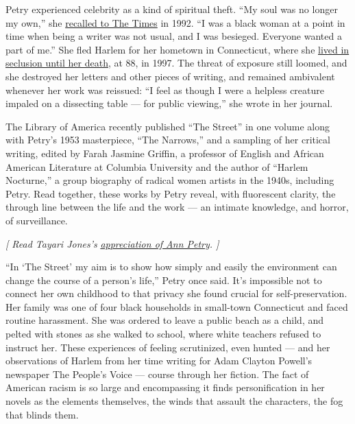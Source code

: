 Petry experienced celebrity as a kind of spiritual theft. ``My soul was
no longer my own,'' she
\href{https://www.nytimes3xbfgragh.onion/1992/01/08/books/an-author-s-look-at-1940-s-harlem-is-being-reissued.html}{recalled
to The Times} in 1992. ``I was a black woman at a point in time when
being a writer was not usual, and I was besieged. Everyone wanted a part
of me.'' She fled Harlem for her hometown in Connecticut, where she
\href{https://www.nytimes3xbfgragh.onion/1997/04/30/arts/ann-petry-88-first-to-write-a-literary-portrait-of-harlem.html}{lived
in seclusion until her death}, at 88, in 1997. The threat of exposure
still loomed, and she destroyed her letters and other pieces of writing,
and remained ambivalent whenever her work was reissued: ``I feel as
though I were a helpless creature impaled on a dissecting table --- for
public viewing,'' she wrote in her journal.

The Library of America recently published ``The Street'' in one volume
along with Petry's 1953 masterpiece, ``The Narrows,'' and a sampling of
her critical writing, edited by Farah Jasmine Griffin, a professor of
English and African American Literature at Columbia University and the
author of ``Harlem Nocturne,'' a group biography of radical women
artists in the 1940s, including Petry. Read together, these works by
Petry reveal, with fluorescent clarity, the through line between the
life and the work --- an intimate knowledge, and horror, of
surveillance.

\emph{{[} Read Tayari Jones's}
\href{https://www.nytimes3xbfgragh.onion/2018/11/10/books/review/in-praise-of-ann-petry.html}{\emph{appreciation
of Ann Petry}}\emph{. {]}}

``In `The Street' my aim is to show how simply and easily the
environment can change the course of a person's life,'' Petry once said.
It's impossible not to connect her own childhood to that privacy she
found crucial for self-preservation. Her family was one of four black
households in small-town Connecticut and faced routine harassment. She
was ordered to leave a public beach as a child, and pelted with stones
as she walked to school, where white teachers refused to instruct her.
These experiences of feeling scrutinized, even hunted --- and her
observations of Harlem from her time writing for Adam Clayton Powell's
newspaper The People's Voice --- course through her fiction. The fact of
American racism is so large and encompassing it finds personification in
her novels as the elements themselves, the winds that assault the
characters, the fog that blinds them.

